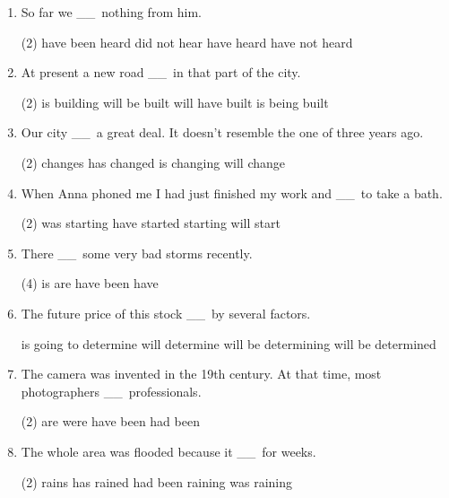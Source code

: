 \documentclass{yufa}
\newcommand\ttu{ \_\_\ }
\begin{document}
\begin{enumerate}
\item So far we \ttu nothing from him.
  \begin{tasks}(2)
    \task have been heard
    \task did not hear
    \task have heard
    \task have not heard
  \end{tasks}


\item At present a new road \ttu in that part of the city.
  \begin{tasks}(2)
    \task is building
    \task will be built
    \task will have built
    \task is being built
  \end{tasks}

\item Our city \ttu a great deal. It doesn't resemble the one of three years ago.
  \begin{tasks}(2)
    \task changes
    \task has changed
    \task is changing
    \task will change
  \end{tasks}

\item When Anna phoned me I had just finished my work and \ttu to take a bath.
  \begin{tasks}(2)
    \task was starting
    \task have started
    \task starting
    \task will start
  \end{tasks}

\item There \ttu some very bad storms recently.
  \begin{tasks}(4)
    \task is
    \task are
    \task have been
    \task have
  \end{tasks}

\item  The future price of this stock \ttu by several factors.
  \begin{tasks}
    \task is going to determine
    \task will determine
    \task will be determining
    \task will be determined
  \end{tasks}

\item The camera was invented in the 19th century. At that time, most photographers \ttu professionals.
  \begin{tasks}(2)
    \task are
    \task were
    \task have been
    \task had been
  \end{tasks}

\item The whole area was flooded because it \ttu for weeks.
  \begin{tasks}(2)
    \task rains
    \task has rained
    \task had been raining
    \task was raining
  \end{tasks}


\end{enumerate}
\end{document}
